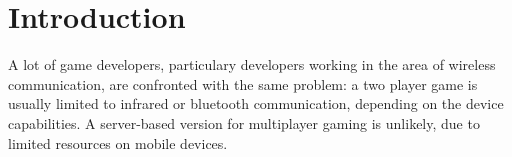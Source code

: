 

\pagestyle{empty}
\sloppy


\begin{abstract}

	SimME is a multiplayer game for mobile devices (mobile phones, PDAs, ...)
	developed to provide a basis for a gaming forum in which new games can
	easily be integrated. The architecture described in this document is
	targeted on assisting the implementation of multiplayer games for mobile
	devices.

\end{abstract}

\section{Introduction}

	A lot of game developers, particulary developers working in the area of
	wireless communication, are confronted with the same problem: a two player
	game is usually limited to infrared or bluetooth communication, depending on
	the device capabilities. A server-based version for multiplayer gaming is
	unlikely, due to limited resources on mobile devices.


